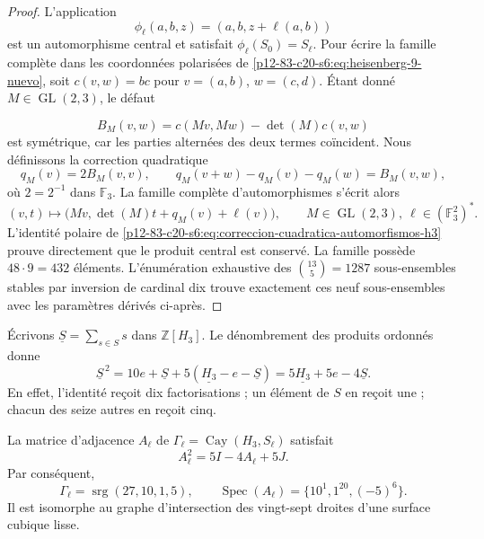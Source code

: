 \begin{proof}
L'application
\[
 \phi_\ell(a,b,z)=(a,b,z+\ell(a,b))
\]
est un automorphisme central et satisfait
\(\phi_\ell(S_0)=S_\ell\). Pour écrire la famille complète dans les
coordonnées polarisées de \cref{p12-83-c20-s6:eq:heisenberg-9-nuevo}, soit
\(c(v,w)=b c\) pour \(v=(a,b)\), \(w=(c,d)\). Étant donné
\(M\in\operatorname{GL}(2,3)\), le défaut

\[
 B_M(v,w)=c(Mv,Mw)-\det(M)c(v,w)
\]
est symétrique, car les parties alternées des deux termes coïncident. Nous définissons la correction quadratique
\begin{equation}
 q_M(v)=2B_M(v,v),
 \qquad
 q_M(v+w)-q_M(v)-q_M(w)=B_M(v,w),
 \label{p12-83-c20-s6:eq:correccion-cuadratica-automorfismos-h3}
\end{equation}
où \(2=2^{-1}\) dans \(\mathbb F_3\). La famille complète d'automorphismes s'écrit alors
\begin{equation}
 (v,t)\longmapsto
 \bigl(Mv,\det(M)t+q_M(v)+\ell(v)\bigr),
 \qquad M\in\operatorname{GL}(2,3),\
 \ell\in(\mathbb F_3^2)^*.
 \label{p12-83-c20-s6:eq:automorfismos-h3-completos}
\end{equation}
L’identité polaire de \cref{p12-83-c20-s6:eq:correccion-cuadratica-automorfismos-h3}
prouve directement que le produit central est conservé. La famille possède
\(48\cdot9=432\) éléments. L’énumération exhaustive des
\(\binom{13}{5}=1287\) sous-ensembles stables par inversion de cardinal dix
trouve exactement ces neuf sous-ensembles avec les paramètres dérivés
ci-après.
\end{proof}

Écrivons \(\underline S=\sum_{s\in S}s\) dans
\(\mathbb Z[H_3]\). Le dénombrement des produits ordonnés donne
\begin{equation}
 \underline S^{\,2}
 =10e+\underline S+5(\underline{H_3}-e-\underline S)
 =5\underline{H_3}+5e-4\underline S.
 \label{p12-83-c20-s6:eq:identidad-grupo-schlafli-nueva}
\end{equation}
En effet, l'identité reçoit dix factorisations ; un élément de \(S\) en reçoit une ; chacun des seize autres en reçoit cinq.

\begin{theorem}
\label{p12-83-c20-s6:thm:grafo-27-rectas-nuevo}
La matrice d’adjacence \(A_\ell\) de
\(\Gamma_\ell=\operatorname{Cay}(H_3,S_\ell)\) satisfait
\begin{equation}
 A_\ell^2=5I-4A_\ell+5J.
 \label{p12-83-c20-s6:eq:identidad-schlafli-nueva}
\end{equation}
Par conséquent,
\[
 \Gamma_\ell=\operatorname{srg}(27,10,1,5),
 \qquad
 \operatorname{Spec}(A_\ell)=\{10^1,1^{20},(-5)^6\}.
\]
Il est isomorphe au graphe d'intersection des vingt-sept droites d'une surface cubique lisse.
\end{theorem}

